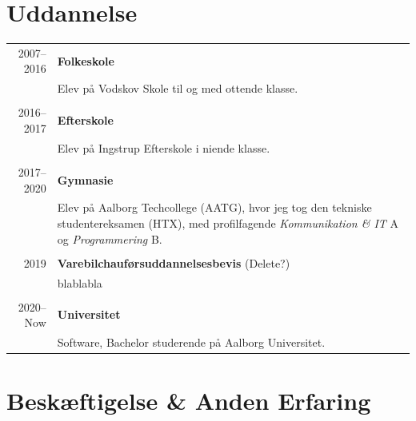 \documentclass{article}
\begin{document}
    \section*{Uddannelse}
    \begin{tabular}{r|p{.82\linewidth}} 
        2007--2016 & \textbf{Folkeskole}\\
    &   Elev på Vodskov Skole til og med ottende klasse.
        \\\\
        2016--2017 & \textbf{Efterskole}\\
    &   Elev på Ingstrup Efterskole i niende klasse.
        \\\\
        2017--2020 & \textbf{Gymnasie}\\
    &   Elev på Aalborg Techcollege (AATG), hvor jeg tog den tekniske studentereksamen (HTX),
        med profilfagende \textit{Kommunikation \& IT} A og \textit{Programmering} B.
        \\\\
        2019 & \textbf{Varebilchauførsuddannelsesbevis} (Delete?)\\
    &   blablabla
        \\\\
        2020--Now & \textbf{Universitet}\\
    &   Software, Bachelor studerende på Aalborg Universitet.
    \end{tabular}
 
    \section*{Beskæftigelse \& Anden Erfaring}
\end{document}
